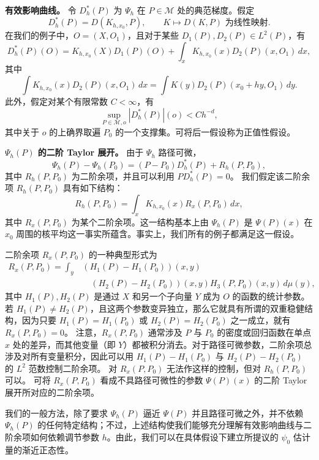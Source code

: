 \noindent\textbf{有效影响曲线。}\enspace
令 $D_h^*(P)$ 为 $\Psi_h$ 在 $P\in\mathcal M$ 处的典范梯度。假定
\[
 D_h^*(P)=D(K_{h,x_0},P),
 \qquad K\mapsto D(K,P)\text{ 为线性映射}.
\]
在我们的例子中，$O=(X,O_1)$，且对于某些
$D_1(P),D_2(P)\in L^2(P)$，有
\[
 D_h^*(P)(O)=K_{h,x_0}(X)D_1(P)(O)
   +\int_x K_{h,x_0}(x)D_2(P)(x,O_1)\,dx,
\]
其中
\[
 \int K_{h,x_0}(x)D_2(P)(x,O_1)\,dx
 =\int K(y)D_2(P)(x_0+hy,O_1)\,dy.
\]
此外，假定对某个有限常数 $C<\infty$，有
\begin{equation}
 \sup_{P\in\mathcal M,o}|D_h^*(P)|(o)<Ch^{-d},
\tag{25.1}
\end{equation}
其中关于 $o$ 的上确界取遍 $P_0$ 的一个支撑集。可将后一假设称为正值性假设。

\noindent\textbf{$\Psi_h(P)$ 的二阶 Taylor 展开。}\enspace
由于 $\Psi_h$ 路径可微，
\[
 \Psi_h(P)-\Psi_h(P_0)=(P-P_0)D_h^*(P)+R_h(P,P_0),
\]
其中 $R_h(P,P_0)$ 为二阶余项，并且可以利用 $PD_h^*(P)=0$。
我们假定该二阶余项 $R_h(P,P_0)$ 具有如下结构：
\begin{equation}
 R_h(P,P_0)=\int_x K_{h,x_0}(x)R_x(P,P_0)\,dx,
\tag{25.2}
\end{equation}
其中 $R_x(P,P_0)$ 为某个二阶余项。这一结构基本上由 $\Psi_h(P)$ 是 $\Psi(P)(x)$ 在 $x_0$ 周围的核平均这一事实所蕴含。事实上，我们所有的例子都满足这一假设。

二阶余项 $R_x(P,P_0)$ 的一种典型形式为
\[
\begin{aligned}
 R_x(P,P_0)=\int_y
 &(H_1(P)-H_1(P_0))(x,y)\\
 &\quad(H_2(P)-H_2(P_0))(x,y)H_3(P,P_0)(x,y)\,d\mu(y),
\end{aligned}
\]
其中 $H_1(P),H_2(P)$ 是通过 $X$ 和另一个子向量 $Y$ 成为 $O$ 的函数的统计参数。
若 $H_1(P)\ne H_2(P)$，且这两个参数变异独立，那么它就具有所谓的双重稳健结构，因为只要
$H_1(P)=H_1(P_0)$ 或 $H_2(P)=H_2(P_0)$ 之一成立，就有
$R_x(P,P_0)=0$。
注意，$R_x(P,P_0)$ 通常涉及 $P$ 与 $P_0$ 的密度或回归函数在单点 $x$ 处的差异，而其他变量（即 $Y$）都被积分消去。对于路径可微参数，二阶余项总涉及对所有变量积分，因此可以用
$H_1(P)-H_1(P_0)$ 与 $H_2(P)-H_2(P_0)$ 的 $L^2$ 范数控制二阶余项。
对 $R_x(P,P_0)$ 无法作这样的控制，但对 $R_h(P,P_0)$ 可以。
可将 $R_x(P,P_0)$ 看成不具路径可微性的参数 $\Psi(P)(x)$ 的二阶 Taylor 展开所对应的二阶余项。

我们的一般方法，除了要求 $\Psi_h(P)$ 逼近 $\Psi(P)$ 并且路径可微之外，并不依赖 $\Psi_h(P)$ 的任何特定结构；不过，上述结构使我们能够充分理解有效影响曲线与二阶余项如何依赖调节参数 $h$。由此，我们可以在具体假设下建立所提议的 $\psi_0$ 估计量的渐近正态性。
